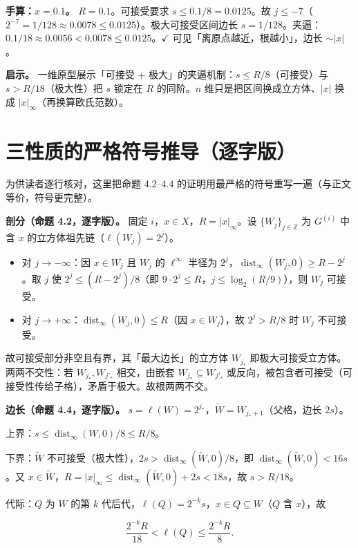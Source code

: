 \documentclass[a4paper,11pt,openany]{ctexbook}
\numberwithin{equation}{chapter}
\numberwithin{figure}{chapter}
\numberwithin{table}{chapter}
\begin{document}
\textbf{手算：$x=0.1$。} $R=0.1$。可接受要求 $s\le0.1/8=0.0125$。故 $j\le-7$（$2^{-7}=1/128\approx0.0078\le0.0125$）。极大可接受区间边长 $s=1/128$。夹逼：$0.1/18\approx0.0056<0.0078\le0.0125$。$\checkmark$ 可见「离原点越近，根越小」，边长 $\sim|x|$。

\textbf{启示。} 一维原型展示「可接受 + 极大」的夹逼机制：$s\le R/8$（可接受）与 $s>R/18$（极大性）把 $s$ 锁定在 $R$ 的同阶。$n$ 维只是把区间换成立方体、$|x|$ 换成 $|x|_\infty$（再换算欧氏范数）。

\section{三性质的严格符号推导（逐字版）}

为供读者逐行核对，这里把命题 4.2–4.4 的证明用最严格的符号重写一遍（与正文等价，符号更完整）。

\textbf{剖分（命题 4.2，逐字版）。} 固定 $i$，$x\in X$，$R=|x|_\infty$。设 $\{W_j\}_{j\in\mathbb Z}$ 为 $G^{(i)}$ 中含 $x$ 的立方体祖先链（$\ell(W_j)=2^j$）。

\begin{itemize}
\item 对 $j\to-\infty$：因 $x\in W_j$ 且 $W_j$ 的 $\ell^\infty$ 半径为 $2^j$，$\operatorname{dist}_\infty(W_j,0)\ge R-2^j$。取 $j$ 使 $2^j\le(R-2^j)/8$（即 $9\cdot2^j\le R$，$j\le\log_2(R/9)$），则 $W_j$ 可接受。
\item 对 $j\to+\infty$：$\operatorname{dist}_\infty(W_j,0)\le R$（因 $x\in W_j$），故 $2^j>R/8$ 时 $W_j$ 不可接受。
\end{itemize}

故可接受部分非空且有界，其「最大边长」的立方体 $W_{j_*}$ 即极大可接受立方体。两两不交性：若 $W_{j_*},W_{j'_*}$ 相交，由嵌套 $W_{j_*}\subseteq W_{j'_*}$ 或反向，被包含者可接受（可接受性传给子格），矛盾于极大。故根两两不交。

\textbf{边长（命题 4.4，逐字版）。} $s=\ell(W)=2^{j_*}$，$\widetilde W=W_{j_*+1}$（父格，边长 $2s$）。

上界：$s\le\operatorname{dist}_\infty(W,0)/8\le R/8$。

下界：$\widetilde W$ 不可接受（极大性），$2s>\operatorname{dist}_\infty(\widetilde W,0)/8$，即 $\operatorname{dist}_\infty(\widetilde W,0)<16s$。又 $x\in\widetilde W$，$R=|x|_\infty\le\operatorname{dist}_\infty(\widetilde W,0)+2s<18s$，故 $s>R/18$。

代际：$Q$ 为 $W$ 的第 $k$ 代后代，$\ell(Q)=2^{-k}s$，$x\in Q\subseteq W$（$Q$ 含 $x$），故

$$\frac{2^{-k}R}{18}<\ell(Q)\le\frac{2^{-k}R}{8}.$$
\end{document}
